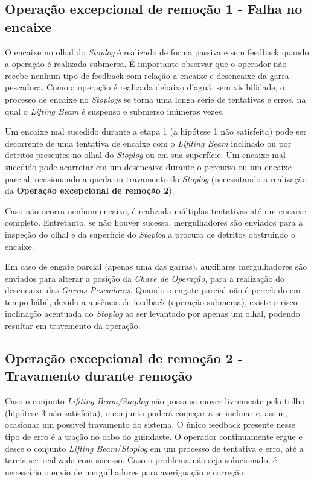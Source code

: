 \subsection{Operação excepcional de remoção 1 - Falha no encaixe}
\label{op:rem:1}
O encaixe no olhal do \emph{Stoplog} é realizado de forma passiva e sem feedback
quando a operação é realizada submersa. É importante observar que o operador não
recebe nenhum tipo de feedback com relação a encaixe e desencaixe da garra
pescadora. Como a operação é realizada debaixo d'aguá, sem visibilidade, o
processo de encaixe no \emph{Stoplogs} se torna uma longa série de tentativas e
erros, na qual o \emph{Lifting Beam} é suspenso e submerso inúmeras vezes.

Um encaixe mal sucedido durante a etapa 1 (a hipótese 1 não satisfeita) pode ser
decorrente de uma tentativa de encaixe com o \emph{Lifiting Beam} inclinado ou
por detritos presentes no olhal do \emph{Stoplog} ou em sua superfície. Um
encaixe mal sucedido pode acarretar em um desencaixe durante o percurso ou um
encaixe parcial, ocasionando a queda ou travamento do \emph{Stoplog}
(necessitando a realização da \textbf{Operação excepcional de remoção 2}).

Caso não ocorra nenhum encaixe, é realizada múltiplas tentativas até um encaixe
completo. Entretanto, se não houver sucesso, mergulhadores são enviados para a
inspeção do olhal e da superfície do \emph{Stoplog} a procura de detritos
obstruindo o encaixe.

Em caso de engate parcial (apenas uma das garras), auxiliares mergulhadores
são enviados para alterar a posição da \emph{Chave de Operação}, para a
realização do desencaixe das \emph{Garras Pescadoras}. Quando o engate
parcial não é percebido em tempo hábil, devido a ausência de feedback (operação
submersa), existe o risco inclinação acentuada do \emph{Stoplog} ao ser levantado por apenas um olhal, podendo resultar em travemento da operação. 



\subsection{Operação excepcional de remoção 2 - Travamento durante remoção}
\label{op:rem:2}

Caso o conjunto \emph{Lifiting Beam/Stoplog} não possa se mover livremente pelo trilho (hipótese 3 não satisfeita), o conjunto poderá começar a se inclinar e, assim, ocasionar um possível travamento do sistema. O único feedback presente nesse tipo de erro é a tração no cabo do guindaste. O operador continuamente ergue e desce o conjunto \emph{Lifting Beam}/\emph{Stoplog} em um 
processo de tentativa e erro, até a tarefa ser realizada com sucesso.
Caso o problema não seja solucionado, é necessário o envio de mergulhadores para averiguação e correção. 


